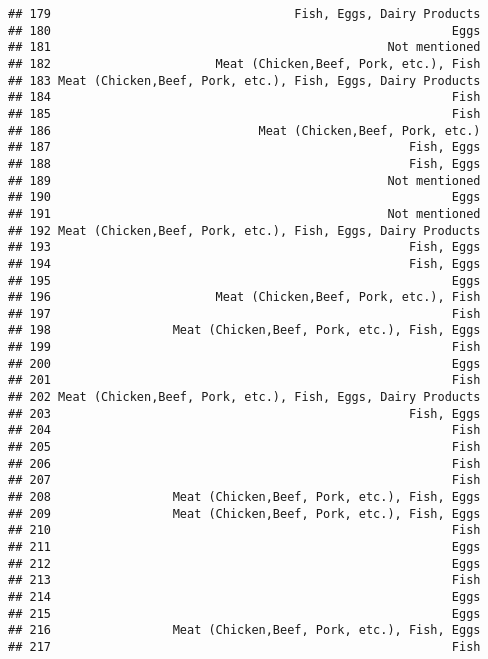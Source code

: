 \documentclass[
]{article}
\begin{document}
\begin{verbatim}
## 179                                  Fish, Eggs, Dairy Products
## 180                                                        Eggs
## 181                                               Not mentioned
## 182                       Meat (Chicken,Beef, Pork, etc.), Fish
## 183 Meat (Chicken,Beef, Pork, etc.), Fish, Eggs, Dairy Products
## 184                                                        Fish
## 185                                                        Fish
## 186                             Meat (Chicken,Beef, Pork, etc.)
## 187                                                  Fish, Eggs
## 188                                                  Fish, Eggs
## 189                                               Not mentioned
## 190                                                        Eggs
## 191                                               Not mentioned
## 192 Meat (Chicken,Beef, Pork, etc.), Fish, Eggs, Dairy Products
## 193                                                  Fish, Eggs
## 194                                                  Fish, Eggs
## 195                                                        Eggs
## 196                       Meat (Chicken,Beef, Pork, etc.), Fish
## 197                                                        Fish
## 198                 Meat (Chicken,Beef, Pork, etc.), Fish, Eggs
## 199                                                        Fish
## 200                                                        Eggs
## 201                                                        Fish
## 202 Meat (Chicken,Beef, Pork, etc.), Fish, Eggs, Dairy Products
## 203                                                  Fish, Eggs
## 204                                                        Fish
## 205                                                        Fish
## 206                                                        Fish
## 207                                                        Fish
## 208                 Meat (Chicken,Beef, Pork, etc.), Fish, Eggs
## 209                 Meat (Chicken,Beef, Pork, etc.), Fish, Eggs
## 210                                                        Fish
## 211                                                        Eggs
## 212                                                        Eggs
## 213                                                        Fish
## 214                                                        Eggs
## 215                                                        Eggs
## 216                 Meat (Chicken,Beef, Pork, etc.), Fish, Eggs
## 217                                                        Fish

\end{verbatim}
\end{document}
